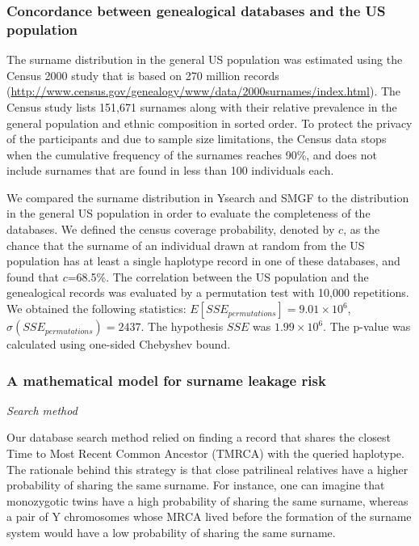 \subsubsection{Concordance between genealogical databases and the US population}
The surname distribution in the general US population was estimated using the Census 2000 study that is based on 270 million records (\url{http://www.census.gov/genealogy/www/data/2000surnames/index.html}). The Census study lists 151,671 surnames along with their relative prevalence in the general population and ethnic composition in sorted order. To protect the privacy of the participants and due to sample size limitations, the Census data stops when the cumulative frequency of the surnames reaches 90\%, and does not include surnames that are found in less than 100 individuals each. 

We compared the surname distribution in Ysearch and SMGF to the distribution in the general US population in order to evaluate the completeness of the databases. We defined the census coverage probability, denoted by $c$, as the chance that the surname of an individual drawn at random from the US population has at least a single haplotype record in one of these databases, and found that $c$=68.5\%. The correlation between the US population and the genealogical records was evaluated by a permutation test with 10,000 repetitions. We obtained the following statistics: $E[SSE_{permutations}]=9.01 \times 10^6$, $\sigma(SSE_{permutations})=2437$. The hypothesis $SSE$ was $1.99 \times 10^6$. The p-value was calculated using one-sided Chebyshev bound.

\subsubsection{A mathematical model for surname leakage risk}

\emph{Search method}

Our database search method relied on finding a record that shares the closest Time to Most Recent Common Ancestor (TMRCA) with the queried haplotype. The rationale behind this strategy is that close patrilineal relatives have a higher probability of sharing the same surname. For instance, one can imagine that monozygotic twins have a high probability of sharing the same surname, whereas a pair of Y chromosomes whose MRCA lived before the formation of the surname system would have a low probability of sharing the same surname. 

